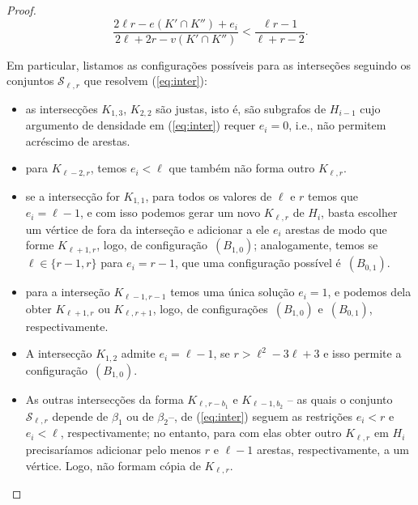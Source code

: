 \documentclass[12pt,a4paper]{book}
\newcommand{\K}{K_{\ell,r}} %
\newcommand{\Slr}{\mathcal{S}_{\ell,r}} %
\begin{document}
\begin{proof}
    \begin{equation}\label{eq:inter}
        \frac{2\ell r - e(K'\cap K'') + e_i}{2\ell+2r - v(K' \cap K'')} < \frac{\ell r- 1}{\ell+r-2}.
    \end{equation}
	    
     Em particular, listamos as configurações possíveis para as interseções seguindo os conjuntos $\Slr$ que resolvem (\ref{eq:inter}):
     \begin{itemize}
         \item as intersecções $K_{1,3}$, $K_{2,2}$ são  justas, isto é, são subgrafos de $H_{i-1}$ cujo argumento de densidade em (\ref{eq:inter}) requer $e_i=0$, i.e., não permitem acréscimo de arestas.
         
         \item para $K_{\ell-2,r}$, temos $e_i < \ell$ que também não forma outro $\K$.
         
        \item se a intersecção for $K_{1,1}$, para todos os valores de $\ell$ e $r$ temos que $e_i = \ell-1$, e com isso podemos gerar um novo $\K$ de $H_{i}$, basta escolher um vértice de fora da interseção e adicionar a ele $e_i$ arestas de modo que forme $K_{\ell+1,r}$, logo, de configuração~\hyperlink{HconfigB}{$(B_{1,0})$}; analogamente, temos se $\ell \in
        \{r-1, r\}$ para $e_i = r-1$, que uma configuração possível é~\hyperlink{HconfigB}{$(B_{0,1})$}.
        
        \item  para a interseção $K_{\ell-1, r-1}$ temos uma única solução $e_i=1$, e podemos dela obter $K_{\ell+1, r}$ ou $K_{\ell,r+1}$, logo, de configurações~\hyperlink{HconfigB}{$(B_{1,0})$}
    e~\hyperlink{HconfigB}{$(B_{0,1})$}, respectivamente.
    
        \item A intersecção $K_{1,2}$ admite $e_i = \ell-1$, se $r > \ell^2 - 3\ell+3$ e isso permite a configuração~\hyperlink{HconfigB}{$(B_{1,0})$}.
        
        \item  As outras intersecções da forma $K_{\ell, r-b_1}$ e $K_{\ell-1,b_2}$ -- as quais o conjunto $\Slr$ depende de $\beta_1$ ou de $\beta_2$--,  de (\ref{eq:inter}) seguem as restrições $e_i < r$ e $e_i < \ell$, respectivamente; no entanto,
    	para com elas obter outro $\K$ em $H_i$ precisaríamos adicionar pelo menos
    	$r$ e $\ell-1$ arestas, respectivamente, a um vértice. Logo, não formam cópia de $\K$. 
     \end{itemize}
      

\end{proof}
\end{document}
